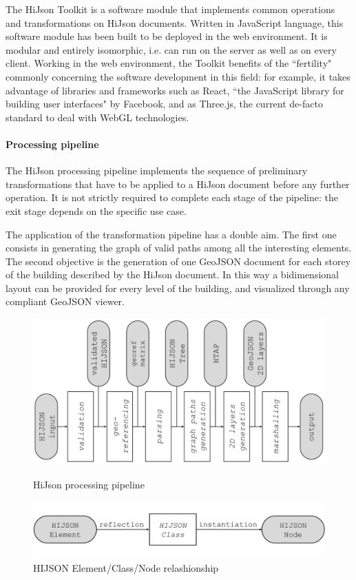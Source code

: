 \documentclass{sig-alternate}
\begin{document}
The HiJson Toolkit is a software module that implements common operations and transformations on HiJson documents. Written in JavaScript language, this software module has been built to be deployed in the web environment. It is modular and entirely isomorphic, i.e. can run on the server as well as on every client. Working in the web environment, the Toolkit benefits of the ``fertility" commonly concerning the software development in this field: for example, it takes advantage of libraries and frameworks such as React, ``the JavaScript library for building user interfaces" by Facebook, and as Three.js, the current de-facto standard to deal with WebGL technologies.

\paragraph{Processing pipeline} 
The HiJson processing pipeline implements the sequence of preliminary transformations that have to be applied to a HiJson document before any further operation. It is not strictly required to complete each stage of the pipeline: the exit stage depends on the specific use case.

The application of the transformation pipeline has a double aim. The first one consists in generating the graph of valid paths among all the interesting elements. The second objective is the generation of one GeoJSON document for each storey of the building described by the HiJson document. In this way a bidimensional layout can be provided for every level of the building, and visualized through any compliant GeoJSON viewer.

\begin{figure}[!htbp]
\centering
\includegraphics[width=.7\linewidth]{../images/pipeline-2}
\caption{HiJson processing pipeline}
\label{fig:pipeline}
\includegraphics[width=.7\linewidth]{../images/element-class-node}
\vspace{-2mm}
\caption{HIJSON Element/Class/Node relashionship}
\label{fig:elem-class-node-rel}
\end{figure}
\end{document}
